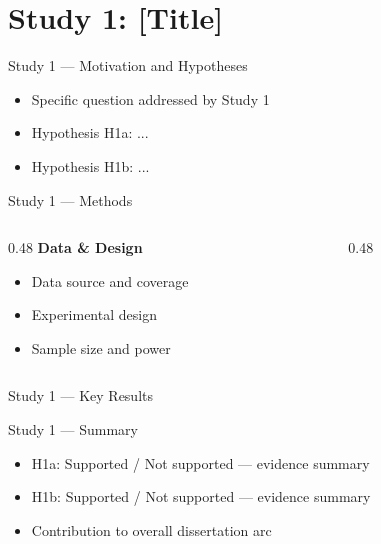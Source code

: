 \documentclass[aspectratio=169,11pt]{beamer}
\begin{document}
\section{Study 1: [Title]}

\begin{frame}{Study 1 — Motivation and Hypotheses}
  \begin{itemize}
    \item Specific question addressed by Study 1
    \item Hypothesis H1a: ...
    \item Hypothesis H1b: ...
  \end{itemize}
\end{frame}

\begin{frame}{Study 1 — Methods}
  \begin{columns}[T]
    \begin{column}{0.48\textwidth}
      \textbf{Data \& Design}
      \begin{itemize}
        \item Data source and coverage
        \item Experimental design
        \item Sample size and power
      \end{itemize}
    \end{column}
    \begin{column}{0.48\textwidth}
    \end{column}
  \end{columns}
\end{frame}

\begin{frame}{Study 1 — Key Results}
  \begin{center}
  \end{center}
\end{frame}

\begin{frame}{Study 1 — Summary}
  \begin{itemize}
    \item H1a: Supported / Not supported — evidence summary
    \item H1b: Supported / Not supported — evidence summary
    \item Contribution to overall dissertation arc
  \end{itemize}
\end{frame}
\end{document}
